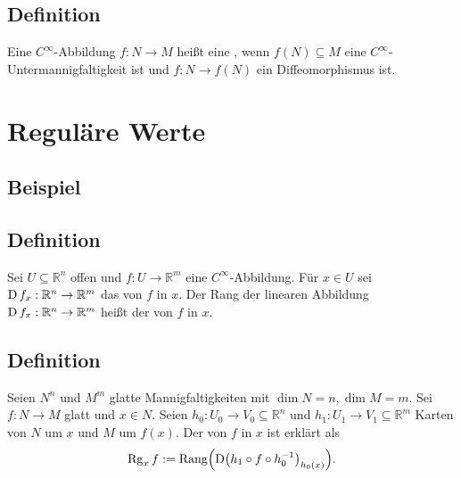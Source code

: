 \subsection[Definition: Einbettung]{Definition} %
\label{sub:1510}
Eine $C^\infty$-Abbildung $f : N \to M$ heißt eine , wenn $f(N) \subseteq M$ eine $C^\infty$-Untermannigfaltig\-keit ist und $f : N \to f(N)$ ein
Diffeomorphismus ist. 
\newpage

\section{Reguläre Werte} %
\label{sec:16}

\subsection{Beispiel} %
\label{sub:161}

\subsection[Definition: Rang des Differentials]{Definition} %
\label{sub:162}
Sei $U \subseteq \mathds{R}^n$ offen und $f : U\to \mathds{R}^m$ eine $C^\infty$-Abbildung. Für $x \in U$ sei $\operatorname{D} f_x : \mathbb{R}^n \to \mathbb{R}^m$ das 
 von $f$ in $x$. Der Rang der linearen Abbildung $\operatorname{D} f_x : \mathbb{R}^n \to \mathbb{R}^m$ heißt der  von $f$ in $x$. 

\subsection[Definition: Rang einer $C^\infty$-Abbildung $f : N \to M$]{Definition} %
\label{sub:163}
Seien $N^n$ und $M^m$ glatte Mannigfaltigkeiten mit $\dim N = n, \dim M =m$. Sei $f : N \to M$ glatt und $x \in N$. Seien $h_0 : U_0 \to V_0 \subseteq \mathds{R}^n$ und
$h_1 : U_1 \to V_1 \subseteq \mathds{R}^m$ Karten von $N$ um $x$ und $M$ um $f(x)$. Der  von $f$ in $x$ ist erklärt als 
\[
	\Rg_x f := \mathrm{Rang} \enbrace[\Big]{\D \enbrace*{h_1 \circ f \circ h_0 ^{-1}}_{h_0(x)}} .
\]

